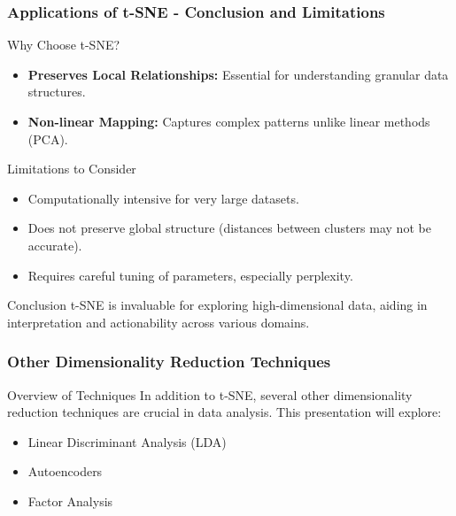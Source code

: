 \documentclass[aspectratio=169]{beamer}
\begin{document}
\begin{frame}[fragile]
    \frametitle{Applications of t-SNE - Conclusion and Limitations}
    \begin{block}{Why Choose t-SNE?}
        \begin{itemize}
            \item \textbf{Preserves Local Relationships:} Essential for understanding granular data structures.
            \item \textbf{Non-linear Mapping:} Captures complex patterns unlike linear methods (PCA).
        \end{itemize}
    \end{block}

    \begin{block}{Limitations to Consider}
        \begin{itemize}
            \item Computationally intensive for very large datasets.
            \item Does not preserve global structure (distances between clusters may not be accurate).
            \item Requires careful tuning of parameters, especially perplexity.
        \end{itemize}
    \end{block}

    \begin{block}{Conclusion}
        t-SNE is invaluable for exploring high-dimensional data, aiding in interpretation and actionability across various domains.
    \end{block}
\end{frame}

\begin{frame}
    \frametitle{Other Dimensionality Reduction Techniques}
    \begin{block}{Overview of Techniques}
        In addition to t-SNE, several other dimensionality reduction techniques are crucial in data analysis. This presentation will explore:
        \begin{itemize}
            \item Linear Discriminant Analysis (LDA)
            \item Autoencoders
            \item Factor Analysis
        \end{itemize}
    \end{block}
\end{frame}
\end{document}
